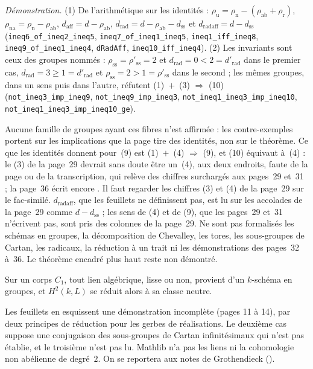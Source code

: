 {\small \emph{Démonstration.} (1) De l'arithmétique sur les identités : $\rho_{\mathrm u} = \rho_{\mathrm n} - (\rho_{\mathrm{ab}} + \rho_{\mathrm r})$, $\rho_{\mathrm{na}} = \rho_{\mathrm n} - \rho_{\mathrm{ab}}$, $d_{\mathrm{aff}} = d - \rho_{\mathrm{ab}}$, $d_{\mathrm{rad}} = d - \rho_{\mathrm{ab}} - d_{\mathrm{ss}}$ et $d_{\mathrm{radaff}} = d - d_{\mathrm{ss}}$ (\texttt{ineq6\_of\_ineq2\_ineq5}, \texttt{ineq7\_of\_ineq1\_ineq5}, \texttt{ineq1\_iff\_ineq8}, \texttt{ineq9\_of\_ineq1\_ineq4}, \texttt{dRadAff}, \texttt{ineq10\_iff\_ineq4}). (2) Les invariants sont ceux des groupes nommés : $\rho_{\mathrm{ss}} = \rho'_{\mathrm{ss}} = 2$ et $d_{\mathrm{rad}} = 0 < 2 = d'_{\mathrm{rad}}$ dans le premier cas, $d_{\mathrm{rad}} = 3 \geq 1 = d'_{\mathrm{rad}}$ et $\rho_{\mathrm{ss}} = 2 > 1 = \rho'_{\mathrm{ss}}$ dans le second ; les mêmes groupes, dans un sens puis dans l'autre, réfutent (1)~$+$~(3) $\Rightarrow$ (10) (\texttt{not\_ineq3\_imp\_ineq9}, \texttt{not\_ineq9\_imp\_ineq3}, \texttt{not\_ineq1\_ineq3\_imp\_ineq10}, \texttt{not\_ineq1\_ineq3\_imp\_ineq10\_ge}).

Aucune famille de groupes ayant ces fibres n'est affirmée : les contre-exemples portent sur les implications que la page tire des identités, non sur le théorème. Ce que les identités donnent pour~(9) est (1)~$+$~(4) $\Rightarrow$ (9), et (10) équivaut à~(4) : le (3) de la page~29 devrait sans doute être un~(4), aux deux endroits, faute de la page ou de la transcription, qui relève des chiffres surchargés aux pages~29 et~31 ; la page~36 écrit encore . Il faut regarder les chiffres (3) et (4) de la page~29 sur le fac-similé. $d_{\mathrm{radaff}}$, que les feuillets ne définissent pas, est lu sur les accolades de la page~29 comme $d - d_{\mathrm{ss}}$ ; les sens de (4) et de (9), que les pages~29 et~31 n'écrivent pas, sont pris des colonnes de la page~29. Ne sont pas formalisés les schémas en groupes, la décomposition de Chevalley, les tores, les sous-groupes de Cartan, les radicaux, la réduction à un trait ni les démonstrations des pages~32 à~36. Le théorème encadré plus haut reste non démontré.\par}

\begin{encadre}
\begin{theoreme*}\nonverifie
Sur un corps $C_1$, tout lien algébrique, lisse ou non, provient d'un $k$-schéma en groupes, et $H^2(k, L)$ se réduit alors à sa classe neutre.
\end{theoreme*}
\end{encadre}
{\small Les feuillets en esquissent une démonstration incomplète (pages 11 à 14), par deux principes de réduction pour les gerbes de réalisations. Le deuxième cas suppose une conjugaison des sous-groupes de Cartan infinitésimaux qui n'est pas établie, et le troisième n'est pas lu. Mathlib n'a pas les liens ni la cohomologie non abélienne de degré~$2$. On se reportera aux notes de Grothendieck ().\par}

